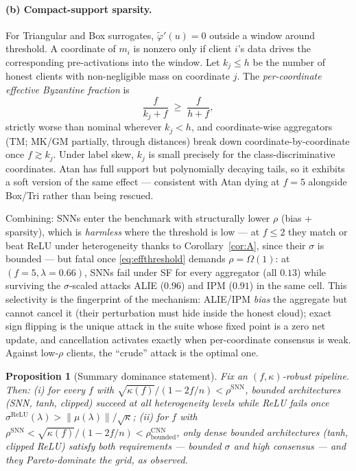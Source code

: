 \documentclass[11pt]{article}
\newtheorem{proposition}{Proposition}
\newcommand{\norm}[1]{\left\lVert #1 \right\rVert}
\begin{document}
\paragraph{(b) Compact-support sparsity.} For Triangular and Box surrogates,
$\tilde\varphi'(u) = 0$ outside a window around threshold. A coordinate of
$m_i$ is nonzero only if client $i$'s data drives the corresponding
pre-activations into the window. Let $k_j \le h$ be the number of honest
clients with non-negligible mass on coordinate $j$. The \emph{per-coordinate
effective Byzantine fraction} is
\begin{equation}
\frac{f}{k_j + f} \;\ge\; \frac{f}{h+f},
\end{equation}
strictly worse than nominal wherever $k_j < h$, and coordinate-wise aggregators
(TM; MK/GM partially, through distances) break down coordinate-by-coordinate
once $f \gtrsim k_j$. Under label skew, $k_j$ is small precisely for the
class-discriminative coordinates. Atan has full support but polynomially
decaying tails, so it exhibits a soft version of the same effect --- consistent
with Atan dying at $f{=}5$ alongside Box/Tri rather than being rescued.

\medskip
Combining: SNNs enter the benchmark with structurally lower $\rho$ (bias +
sparsity), which is \emph{harmless} where the threshold is low --- at
$f \le 2$ they match or beat ReLU under heterogeneity thanks to
Corollary~\ref{cor:A}, since their $\sigma$ is bounded --- but fatal once
\eqref{eq:effthreshold} demands $\rho = \Omega(1)$: at
$(f{=}5, \lambda{=}0.66)$, SNNs fail under SF for every aggregator (all
$0.13$) while surviving the $\sigma$-scaled attacks ALIE ($0.96$) and IPM
($0.91$) in the same cell. This selectivity is the fingerprint of the
mechanism: ALIE/IPM \emph{bias} the aggregate but cannot cancel it (their
perturbation must hide inside the honest cloud); exact sign flipping is the
unique attack in the suite whose fixed point is a zero net update, and
cancellation activates exactly when per-coordinate consensus is weak. Against
low-$\rho$ clients, the ``crude'' attack is the optimal one.

\begin{proposition}[Summary dominance statement]
Fix an $(f,\kappa)$-robust pipeline. Then:
(i) for every $f$ with $\sqrt{\kappa(f)}/(1-2f/n) < \rho^{\mathrm{SNN}}$,
bounded architectures (SNN, tanh, clipped) succeed at all heterogeneity levels
while ReLU fails once $\sigma^{\mathrm{ReLU}}(\lambda) >
\norm{\mu(\lambda)}/\sqrt{\kappa}$;
(ii) for $f$ with
$\rho^{\mathrm{SNN}} < \sqrt{\kappa(f)}/(1-2f/n) < \rho^{\mathrm{CNN}}_{\mathrm{bounded}}$,
only dense bounded architectures (tanh, clipped ReLU) satisfy both
requirements --- bounded $\sigma$ \emph{and} high consensus --- and they
Pareto-dominate the grid, as observed.
\end{proposition}
\end{document}
